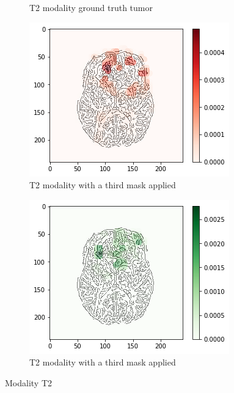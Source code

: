 \begin{figure}[H]
\begin{subfigure}[t]{.21\textwidth}
        \caption{T2 modality ground truth tumor}
    \end{subfigure}
    \begin{subfigure}[t]{.27\textwidth}
        \centering
        \includegraphics[width=\linewidth]{chapters/06_hdm/c_Brats18_2013_17_1_L1/53.png}
        \caption{T2 modality with a third mask applied}
    \end{subfigure}
    \begin{subfigure}[t]{.27\textwidth}
        \centering
        \includegraphics[width=\linewidth]{chapters/06_hdm/c_Brats18_2013_17_1_L1/54.png}
        \caption{T2 modality with a third mask applied}
    \end{subfigure}
    \caption{Modality T2}
\end{figure}

